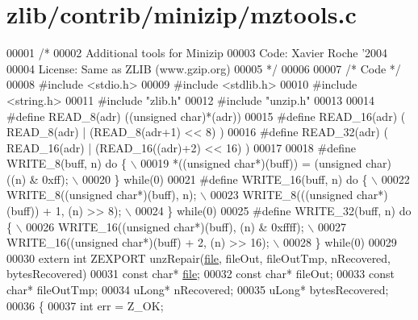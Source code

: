 \hypertarget{zlib_2contrib_2minizip_2mztools_8c_source}{}\section{zlib/contrib/minizip/mztools.c}
\label{zlib_2contrib_2minizip_2mztools_8c_source}

\begin{DoxyCode}
00001 \textcolor{comment}{/*}
00002 \textcolor{comment}{  Additional tools for Minizip}
00003 \textcolor{comment}{  Code: Xavier Roche '2004}
00004 \textcolor{comment}{  License: Same as ZLIB (www.gzip.org)}
00005 \textcolor{comment}{*/}
00006 
00007 \textcolor{comment}{/* Code */}
00008 \textcolor{preprocessor}{#include <stdio.h>}
00009 \textcolor{preprocessor}{#include <stdlib.h>}
00010 \textcolor{preprocessor}{#include <string.h>}
00011 \textcolor{preprocessor}{#include "zlib.h"}
00012 \textcolor{preprocessor}{#include "unzip.h"}
00013 
00014 \textcolor{preprocessor}{#define READ\_8(adr)  ((unsigned char)*(adr))}
00015 \textcolor{preprocessor}{#define READ\_16(adr) ( READ\_8(adr) | (READ\_8(adr+1) << 8) )}
00016 \textcolor{preprocessor}{#define READ\_32(adr) ( READ\_16(adr) | (READ\_16((adr)+2) << 16) )}
00017 
00018 \textcolor{preprocessor}{#define WRITE\_8(buff, n) do \{ \(\backslash\)}
00019 \textcolor{preprocessor}{  *((unsigned char*)(buff)) = (unsigned char) ((n) & 0xff); \(\backslash\)}
00020 \textcolor{preprocessor}{\} while(0)}
00021 \textcolor{preprocessor}{#define WRITE\_16(buff, n) do \{ \(\backslash\)}
00022 \textcolor{preprocessor}{  WRITE\_8((unsigned char*)(buff), n); \(\backslash\)}
00023 \textcolor{preprocessor}{  WRITE\_8(((unsigned char*)(buff)) + 1, (n) >> 8); \(\backslash\)}
00024 \textcolor{preprocessor}{\} while(0)}
00025 \textcolor{preprocessor}{#define WRITE\_32(buff, n) do \{ \(\backslash\)}
00026 \textcolor{preprocessor}{  WRITE\_16((unsigned char*)(buff), (n) & 0xffff); \(\backslash\)}
00027 \textcolor{preprocessor}{  WRITE\_16((unsigned char*)(buff) + 2, (n) >> 16); \(\backslash\)}
00028 \textcolor{preprocessor}{\} while(0)}
00029 
00030 \textcolor{keyword}{extern} \textcolor{keywordtype}{int} ZEXPORT unzRepair(\hyperlink{structfile}{file}, fileOut, fileOutTmp, nRecovered, bytesRecovered)
00031 \textcolor{keyword}{const} \textcolor{keywordtype}{char}* \hyperlink{structfile}{file};
00032 \textcolor{keyword}{const} \textcolor{keywordtype}{char}* fileOut;
00033 \textcolor{keyword}{const} \textcolor{keywordtype}{char}* fileOutTmp;
00034 uLong* nRecovered;
00035 uLong* bytesRecovered;
00036 \{
00037   \textcolor{keywordtype}{int} err = Z\_OK;

\end{DoxyCode}
